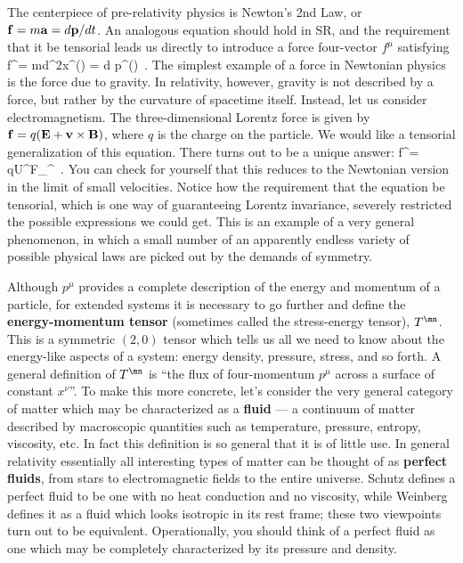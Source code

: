 \documentclass[12pt]{article}
\begin{document}
The centerpiece of pre-relativity physics is Newton's 2nd Law,
or ${\bf f}=m{\bf a} = d{\bf p}/dt$.  An analogous equation should hold
in SR, and the requirement that it be tensorial leads us directly
to introduce a force four-vector $f^\mu$ satisfying
\be
  f^\mu = m{{d^2}}x^\mu(\tau) = {{d}}
  p^\mu(\tau)\ .\label{1.102}
\ee
The simplest example of a force in Newtonian physics is the force
due to gravity.  In relativity, however, gravity is not described
by a force, but rather by the curvature of spacetime itself.  Instead,
let us consider electromagnetism.  The three-dimensional Lorentz
force is given by ${\bf f} = q({\bf E} + {\bf v}\times{\bf B})$,
where $q$ is the charge on the particle.  We would like a tensorial
generalization of this equation.  There turns out to be a unique answer:
\be
  f^\mu = qU^\lambda F_\lambda{}^\mu\ .\label{1.103}
\ee
You can check for yourself that this reduces to the Newtonian version 
in the limit of small velocities.  Notice how the requirement that
the equation be tensorial, which is one way of guaranteeing Lorentz
invariance, severely restricted the possible expressions we could
get.  This is an example of a very general phenomenon, in which 
a small number of an apparently endless variety of possible physical laws 
are picked out by the demands of symmetry.

Although $p^\mu$ provides a complete description of the energy and
momentum of a particle, for extended systems it is necessary to go
further and define the {\bf energy-momentum tensor} (sometimes called
the stress-energy tensor), $T^\mn$.  This is a symmetric $(2,0)$ tensor 
which tells us all we need to know about the energy-like aspects of a 
system: energy density, pressure, stress, and so
forth.  A general definition of $T^\mn$ is ``the flux of four-momentum
$p^\mu$ across a surface of constant $x^\nu$''.  To make this more
concrete, let's consider the very general category of matter which
may be characterized as a {\bf fluid} --- a continuum of matter
described by macroscopic quantities  such as temperature, pressure,
entropy, viscosity, etc.  In fact this definition is so general that
it is of little use.  In general relativity essentially all interesting
types of matter can be thought of as {\bf perfect fluids}, from
stars to electromagnetic fields to the entire universe.  Schutz
defines a perfect fluid to be one with no heat conduction and no
viscosity, while Weinberg defines it as a fluid which looks isotropic
in its rest frame; these two viewpoints turn out to be equivalent.
Operationally, you should think of a perfect fluid as one which may
be completely characterized by its pressure and density.
\end{document}
